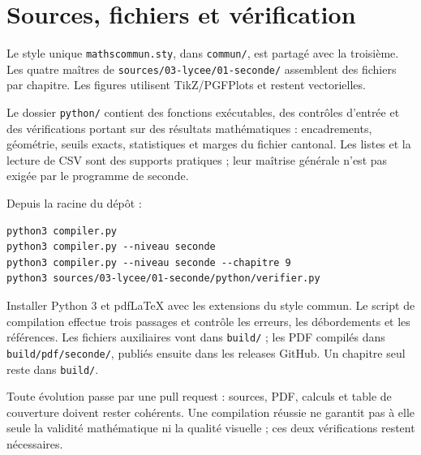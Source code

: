 \documentclass[11pt,a4paper,oneside]{book}
\begin{document}
\chapter{Sources, fichiers et vérification}
Le style unique \texttt{mathscommun.sty}, dans \texttt{commun/}, est partagé avec la troisième. Les quatre maîtres de \texttt{sources/03-lycee/01-seconde/} assemblent des fichiers par chapitre. Les figures utilisent TikZ/PGFPlots et restent vectorielles.

Le dossier \texttt{python/} contient des fonctions exécutables, des contrôles d'entrée et des vérifications portant sur des résultats mathématiques : encadrements, géométrie, seuils exacts, statistiques et marges du fichier cantonal. Les listes et la lecture de CSV sont des supports pratiques ; leur maîtrise générale n'est pas exigée par le programme de seconde.

Depuis la racine du dépôt :
\begin{lstlisting}
python3 compiler.py
python3 compiler.py --niveau seconde
python3 compiler.py --niveau seconde --chapitre 9
python3 sources/03-lycee/01-seconde/python/verifier.py
\end{lstlisting}
Installer Python 3 et pdfLaTeX avec les extensions du style commun. Le script de compilation effectue trois passages et contrôle les erreurs, les débordements et les références. Les fichiers auxiliaires vont dans \texttt{build/} ; les PDF compilés dans \texttt{build/pdf/seconde/}, publiés ensuite dans les releases GitHub. Un chapitre seul reste dans \texttt{build/}.

Toute évolution passe par une pull request : sources, PDF, calculs et table de couverture doivent rester cohérents. Une compilation réussie ne garantit pas à elle seule la validité mathématique ni la qualité visuelle ; ces deux vérifications restent nécessaires.
\end{document}
